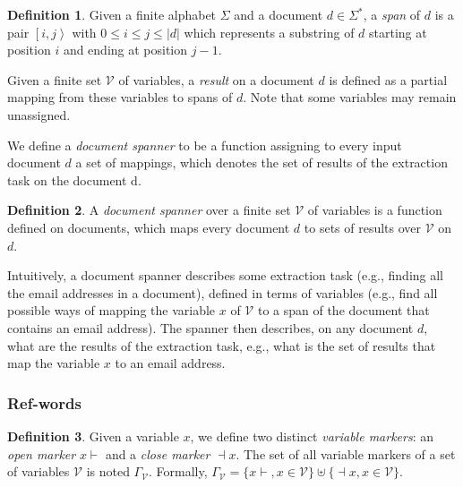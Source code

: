 \documentclass[11px]{article}
\theoremstyle{definition}
\newtheorem{definition}{Definition}
\newcommand{\Span}[1]{\left[ #1 \right\rangle}
\newcommand{\pierre}[1]{\textcolor{magenta}{[\textbf{Pierre:} #1]}}
\begin{document}


        \begin{definition}
          Given a finite alphabet $\Sigma$ and a document $d \in \Sigma^*$, a
          \textit{span} of $d$ is a pair $\Span{i, j}$ with $0 \leq i \leq j
          \leq |d|$ which represents a substring of $d$ starting at position
          $i$ and ending at position $j - 1$.
        \end{definition}

        Given a finite set $\mathcal{V}$ of variables, a \textit{result} on a
        document $d$ is defined as a partial mapping from these variables to
        spans of $d$. Note that some variables may remain unassigned.

        We define a \textit{document spanner} to be a function assigning to
        every input document $d$ a set of mappings, which denotes the set of
        results of the extraction task on the document d.

        \begin{definition}
          A \textit{document spanner} over a finite set $\mathcal{V}$ of
          variables is a function defined on documents, which maps every
          document $d$ to sets of results over $\mathcal{V}$ on $d$.
        \end{definition}

        Intuitively, a document spanner describes some extraction task (e.g.,
        finding all the email addresses in a document), defined in terms of
        variables (e.g., find all possible ways of mapping the variable $x$ of
        $\mathcal{V}$ to a span of the document that contains an email
        address).  The spanner then describes, on any document $d$, what are
        the results of the extraction task, e.g., what is the set of results
        that map the variable $x$ to an email address.


      \subsubsection{Ref-words}


        \begin{definition}
          Given a variable $x$, we define two distinct \textit{variable
          markers}: an \textit{open marker} $x{\vdash}$ and a \textit{close
          marker} ${\dashv}x$. The set of all variable markers of a set of
          variables $\mathcal{V}$ is noted $\Gamma_\mathcal{V}$. Formally,
          $\Gamma_\mathcal{V} = \{x{\vdash}, x \in \mathcal{V}\} \uplus
          \{{\dashv}x, x \in \mathcal{V}\}$.
        \end{definition}
\end{document}
